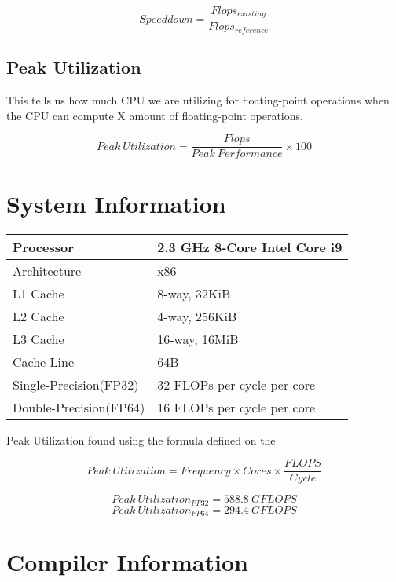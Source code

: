 \begin{equation}
    Speeddown = \frac{Flops_{existing}}{Flops_{reference}}
    \label{eqspeeddown}
\end{equation}

\subsection{Peak Utilization}

This tells us how much CPU we are utilizing for floating-point operations when 
the CPU can compute X amount of floating-point operations.

\begin{equation}
    Peak\ Utilization = \frac{Flops}{Peak\ Performance} \times 100
    \label{eqpeak_util}
\end{equation}

\section{System Information}

\begin{tabular}{|l | l|}
    \hline
    Processor & 2.3 GHz 8-Core Intel Core i9 \\
    \hline
    Architecture & x86 \\
    \hline
    L1 Cache & 8-way, 32KiB \\
    \hline
    L2 Cache & 4-way, 256KiB \\
    \hline
    L3 Cache & 16-way, 16MiB \\
    \hline
    Cache Line & 64B \\
    \hline
    Single-Precision(FP32) & 32 FLOPs per cycle per core \\
    \hline
    Double-Precision(FP64) & 16 FLOPs per cycle per core\\
    \hline
\end{tabular}

Peak Utilization found using the formula defined on the \citep{wiki:FLOPS}

\begin{equation}
    Peak\ Utilization = Frequency \times Cores \times \frac{FLOPS}{Cycle}
\end{equation}

\[Peak\ Utilization_{FP32} = 588.8\ GFLOPS\]
\[Peak\ Utilization_{FP64} = 294.4\ GFLOPS\]

\section{Compiler Information}

